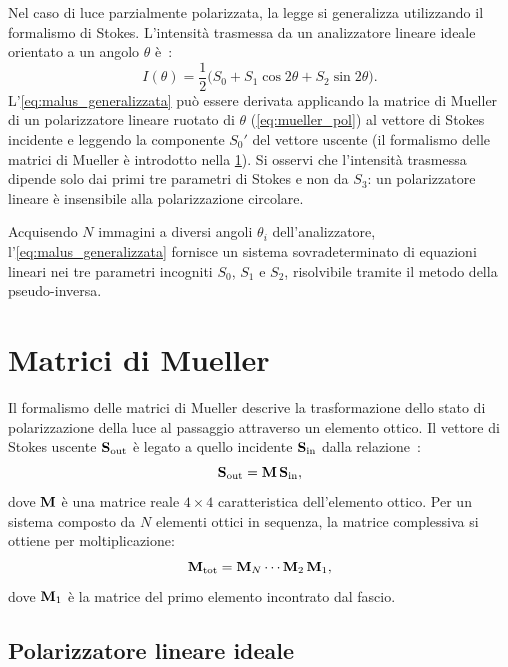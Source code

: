 Nel caso di luce parzialmente polarizzata, la legge si generalizza utilizzando il formalismo di Stokes. L'intensità trasmessa da un analizzatore lineare ideale orientato a un angolo $\theta$ è~\cite{goldstein2011polarized}:
\begin{equation}
\label{eq:malus_generalizzata}
I(\theta) = \frac{1}{2}\bigl(S_0 + S_1\cos 2\theta + S_2\sin 2\theta\bigr).
\end{equation}
L'\cref{eq:malus_generalizzata} può essere derivata applicando la matrice di Mueller di un polarizzatore lineare ruotato di $\theta$ (\cref{eq:mueller_pol}) al vettore di Stokes incidente e leggendo la componente $S_0'$ del vettore uscente (il formalismo delle matrici di Mueller è introdotto nella \cref{sec:mueller}). Si osservi che l'intensità trasmessa dipende solo dai primi tre parametri di Stokes e non da $S_3$: un polarizzatore lineare è insensibile alla polarizzazione circolare.

Acquisendo $N$ immagini a diversi angoli $\theta_i$ dell'analizzatore, l'\cref{eq:malus_generalizzata} fornisce un sistema sovradeterminato di equazioni lineari nei tre parametri incogniti $S_0$, $S_1$ e $S_2$, risolvibile tramite il metodo della pseudo-inversa.


\section{Matrici di Mueller}
\label{sec:mueller}

Il formalismo delle matrici di Mueller descrive la trasformazione dello stato di polarizzazione della luce al passaggio attraverso un elemento ottico. Il vettore di Stokes uscente $\mathbf{S}_\text{out}$ è legato a quello incidente $\mathbf{S}_\text{in}$ dalla relazione~\cite{goldstein2011polarized}:
\begin{equation}
\label{eq:mueller}
\mathbf{S}_\text{out} = \mathbf{M} \, \mathbf{S}_\text{in},
\end{equation}
dove $\mathbf{M}$ è una matrice reale $4 \times 4$ caratteristica dell'elemento ottico. Per un sistema composto da $N$ elementi ottici in sequenza, la matrice complessiva si ottiene per moltiplicazione:
\begin{equation}
\label{eq:mueller_composizione}
\mathbf{M}_\text{tot} = \mathbf{M}_N \cdots \mathbf{M}_2 \, \mathbf{M}_1,
\end{equation}
dove $\mathbf{M}_1$ è la matrice del primo elemento incontrato dal fascio.

\subsection{Polarizzatore lineare ideale}
\label{subsec:mueller_pol}


